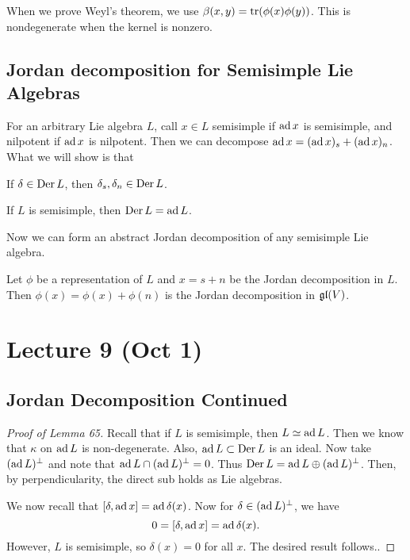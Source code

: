\documentclass[twoside, 10pt]{article}
\begin{document}
    \begin{rmk} When we prove Weyl's theorem, we use $\beta(x,y) =
    \operatorname{tr}(\phi(x)\phi(y))$. This is nondegenerate when the kernel is nonzero.
\end{rmk}

    \subsection{Jordan decomposition for Semisimple Lie Algebras}%
    \label{sub:jordan_decomposition_for_semisimple_lie_algebras}
    
    For an arbitrary Lie algebra $L$, call $x \in L$ semisimple if $\operatorname{ad} x$ is
    semisimple, and nilpotent if $\operatorname{ad} x$ is nilpotent. Then we can decompose
    $\operatorname{ad} x = (\operatorname{ad} x)_s + (\operatorname{ad} x)_n$. What we will show is that 

    \begin{lem} If $\delta \in \operatorname{Der} L$, then $\delta_s, \delta_n \in \operatorname{Der} L$.
    \end{lem}

    \begin{lem} If $L$ is semisimple, then $\operatorname{Der} L = \operatorname{ad} L$.  \end{lem}

    Now we can form an abstract Jordan decomposition of any semisimple Lie
    algebra.

    \begin{thm} Let $\phi$ be a representation of $L$ and $x=s+n$ be the Jordan
    decomposition in $L$. Then $\phi(x) = \phi(x) + \phi(n)$ is the Jordan
decomposition in $\mathfrak{gl}(V)$.  \end{thm}

    \section{Lecture 9 (Oct 1)}%
    
    \subsection{Jordan Decomposition Continued}%
    \label{sub:jordan_decomposition_continued}
    
    \begin{proof}[Proof of Lemma 65] Recall that if $L$ is semisimple, then $L
        \simeq \operatorname{ad} L$. Then we know that $\kappa$ on $\operatorname{ad} L$ is non-degenerate.
        Also, $\operatorname{ad} L \subset \operatorname{Der} L$ is an ideal. Now take $(\operatorname{ad} L)^{\perp}$
        and note that $\operatorname{ad} L \cap (\operatorname{ad} L)^{\perp} = 0$. Thus $\operatorname{Der} L = \operatorname{ad} L
        \oplus (\operatorname{ad} L)^{\perp}$. Then, by perpendicularity, the direct sub
        holds as Lie algebras.

        We now recall that $[\delta, \operatorname{ad} x] = \operatorname{ad} \delta(x)$. Now for $\delta
        \in (\operatorname{ad} L)^{\perp}$, we have \[ 0 = [\delta, \operatorname{ad} x] = \operatorname{ad} \delta(x).\]
        However, $L$ is semisimple, so $\delta(x) = 0$ for all $x$. The desired
        result follows..  \end{proof}
\end{document}
